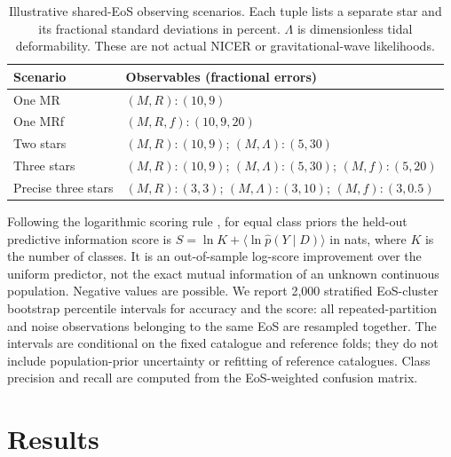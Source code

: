 \documentclass[11pt,a4paper]{article}
\begin{document}
\begin{table}[htbp]\centering\small
\caption{Illustrative shared-EoS observing scenarios. Each tuple lists a separate star and its fractional standard deviations in percent. $\Lambda$ is dimensionless tidal deformability. These are not actual NICER or gravitational-wave likelihoods.}\label{tab:scenarios}
\begin{tabular}{lp{}}\toprule
Scenario & Observables (fractional errors)\\\midrule
One MR & $(M,R):(10,9)$\\
One MRf & $(M,R,f):(10,9,20)$\\
Two stars & $(M,R):(10,9)$; $(M,\Lambda):(5,30)$\\
Three stars & $(M,R):(10,9)$; $(M,\Lambda):(5,30)$; $(M,f):(5,20)$\\
Precise three stars & $(M,R):(3,3)$; $(M,\Lambda):(3,10)$; $(M,f):(3,0.5)$\\\bottomrule
\end{tabular}\end{table}

Following the logarithmic scoring rule \citep{GneitingRaftery07}, for equal class priors the held-out predictive information score is $S=\ln K+\langle\ln \widehat p(Y\mid D)\rangle$ in nats, where $K$ is the number of classes. It is an out-of-sample log-score improvement over the uniform predictor, not the exact mutual information of an unknown continuous population. Negative values are possible. We report 2,000 stratified EoS-cluster bootstrap percentile intervals for accuracy and the score: all repeated-partition and noise observations belonging to the same EoS are resampled together. The intervals are conditional on the fixed catalogue and reference folds; they do not include population-prior uncertainty or refitting of reference catalogues. Class precision and recall are computed from the EoS-weighted confusion matrix.
\section{Results}
\end{document}
